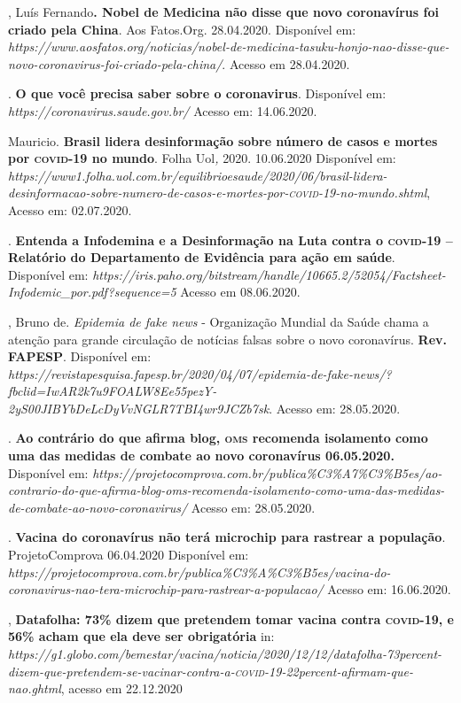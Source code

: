 \begin{bibliohedra}
, Luís Fernando\textbf{. Nobel de Medicina não disse que novo
coronavírus foi criado pela China}. Aos Fatos.Org. 28.04.2020.
Disponível em:
\textit{https://www.aosfatos.org/noticias/nobel-de-medicina-tasuku-honjo-nao-disse-que-novo-coronavirus-foi-criado-pela-china/}.
Acesso em 28.04.2020.

. \textbf{O que você precisa saber sobre o
coronavirus}. Disponível em:
\textit{https://coronavirus.saude.gov.br/}
Acesso em: 14.06.2020.

 Mauricio. \textbf{Brasil lidera desinformação sobre número de
casos e mortes por \textsc{covid-19} no mundo}. Folha Uol\textit{,} 2020.
10.06.2020 Disponível em:
\textit{https://www1.folha.uol.com.br/equilibrioesaude/2020/06/brasil-lidera-desinformacao-sobre-numero-de-casos-e-mortes-por-\textsc{covid-19}-no-mundo.shtml},
Acesso em: 02.07.2020.

. \textbf{Entenda a Infodemina e a Desinformação na Luta
contra o \textsc{covid-19} -- Relatório do Departamento de Evidência para ação em
saúde}. Disponível em:
\textit{https://iris.paho.org/bitstream/handle/10665.2/52054/Factsheet-Infodemic\_por.pdf?sequence=5}
Acesso em 08.06.2020.

, Bruno de.
\textit{Epidemia de fake news} - Organização Mundial da Saúde chama a
atenção para grande circulação de notícias falsas sobre o novo
coronavírus. \textbf{Rev. FAPESP}. Disponível em:
\textit{https://revistapesquisa.fapesp.br/2020/04/07/epidemia-de-fake-news/?fbclid=IwAR2k7u9FOALW8Ee55pezY-2yS00JIBYbDeLcDyVvNGLR7TBI4wr9JCZb7sk}.
Acesso em: 28.05.2020.

.
\textbf{Ao contrário do que afirma blog, \textsc{oms} recomenda isolamento como uma das
medidas de combate ao novo coronavírus 06.05.2020.} Disponível em:
\textit{https://projetocomprova.com.br/publica\%C3\%A7\%C3\%B5es/ao-contrario-do-que-afirma-blog-oms-recomenda-isolamento-como-uma-das-medidas-de-combate-ao-novo-coronavirus/}
Acesso em: 28.05.2020.

\titidem. \textbf{Vacina do coronavírus
não terá microchip para rastrear a população}. ProjetoComprova
06.04.2020 Disponível em:
\textit{https://projetocomprova.com.br/publica\%C3\%A\%C3\%B5es/vacina-do-coronavirus-nao-tera-microchip-para-rastrear-a-populacao/}
Acesso em: 16.06.2020.

, \textbf{Datafolha: 73\% dizem que pretendem tomar vacina contra
\textsc{covid-19}, e 56\% acham que ela deve ser obrigatória} in:
\textit{https://g1.globo.com/bemestar/vacina/noticia/2020/12/12/datafolha-73percent-dizem-que-pretendem-se-vacinar-contra-a-\textsc{covid-19}-22percent-afirmam-que-nao.ghtml},
acesso em 22.12.2020


\end{bibliohedra}
